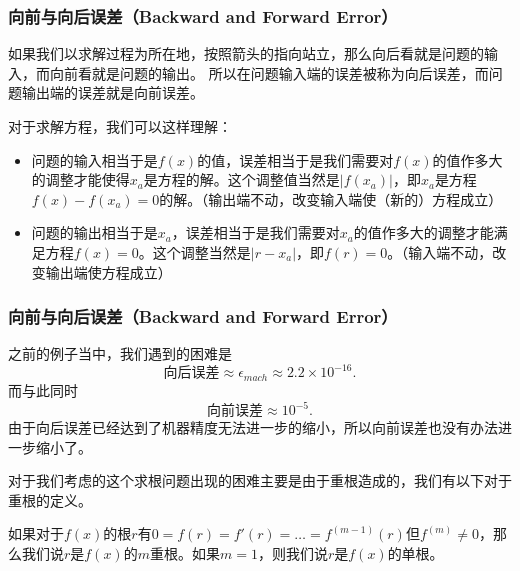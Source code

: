 \documentclass[10pt]{beamer}
\begin{document}
\begin{frame}
\frametitle{向前与向后误差（Backward and Forward Error）}
如果我们以求解过程为所在地，按照箭头的指向站立，那么向后看就是问题的输入，而向前看就是问题的输出。
所以在问题输入端的误差被称为向后误差，而问题输出端的误差就是向前误差。

\vspace{0.2cm}

对于求解方程，我们可以这样理解：
\begin{itemize}
\item 问题的输入相当于是$f(x)$的值，误差相当于是我们需要对$f(x)$的值作多大的调整才能使得$x_a$是方程的解。这个调整值当然是$|f(x_a)|$，即$x_a$是方程$f(x) - f(x_a) = 0$的解。（输出端不动，改变输入端使（新的）方程成立）
\item 问题的输出相当于是$x_a$，误差相当于是我们需要对$x_a$的值作多大的调整才能满足方程$f(x) = 0$。这个调整当然是$|r - x_a|$，即$f(r) = 0$。（输入端不动，改变输出端使方程成立）
\end{itemize}
\end{frame}


\begin{frame}
\frametitle{向前与向后误差（Backward and Forward Error）}
之前的例子当中，我们遇到的困难是
\begin{equation}
\text{向后误差} \approx \epsilon_{mach} \approx 2.2 \times 10^{-16}.
\end{equation}
而与此同时
\begin{equation}
\text{向前误差} \approx 10^{-5}.
\end{equation}
由于向后误差已经达到了机器精度无法进一步的缩小，所以向前误差也没有办法进一步缩小了。

\vspace{0.2cm}

对于我们考虑的这个求根问题出现的困难主要是由于重根造成的，我们有以下对于重根的定义。
\begin{definition}[重根]
如果对于$f(x)$的根$r$有$0 = f(r) = f' (r) = \ldots = f^{(m-1)}(r)$但$f^{(m)} \neq 0$，那么我们说$r$是$f(x)$的$m$重根。如果$m =1$，则我们说$r$是$f(x)$的单根。
\end{definition}
\end{frame}
\end{document}
